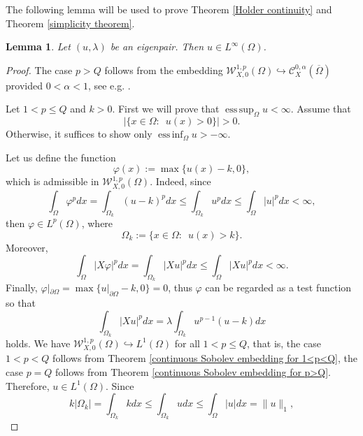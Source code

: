 \documentclass[a4paper,12pt,reqno]{amsart}
\numberwithin{equation}{section}
\theoremstyle{plain}
\newtheorem{lemma}[theorem]{Lemma}
\theoremstyle{definition}
\DeclareMathOperator*{\esssup}{ess\,sup}
\DeclareMathOperator*{\essinf}{ess\,inf}
\begin{document}
The following lemma will be used to prove Theorem \ref{Holder continuity} and Theorem \ref{simplicity theorem}.
\begin{lemma}\label{L infty boundedness}
Let $(u,\lambda)$ be an eigenpair. Then $u\in L^{\infty}(\Omega)$.
\end{lemma}
\begin{proof}
The case $p>Q$ follows from the  embedding $\mathcal{W}_{X,0}^{1, p}(\Omega)\hookrightarrow \mathcal{C}^{0, \alpha}_{X}(\overline{\Omega})$ provided $0<\alpha<1$, see e.g. \cite[Remark 1.1]{chen2024sharp}.

Let $1<p\leq Q$ and $k>0$. First we will prove that $\esssup_{\Omega}u<\infty$. Assume that 
$$\left|\{x\in\Omega:\enspace u(x)>0\}\right|>0.$$
Otherwise, it suffices to show only $\essinf_{\Omega}u>-\infty$.

Let us define the function
\begin{equation*}
\varphi(x):=\max \{u(x)-k, 0\},
\end{equation*}
which is admissible in $\mathcal{W}_{X,0}^{1, p}(\Omega)$. Indeed, since
\begin{equation*}
    \int_{\Omega}\varphi^{p}dx=\int_{\Omega_{k}}(u-k)^{p}dx\leq \int_{\Omega_{k}}u^{p}dx\leq \int_{\Omega}|u|^{p}dx<\infty,
\end{equation*} 
then $\varphi\in L^{p}(\Omega)$, where
\begin{equation*}
\Omega_{k}:=\{x \in \Omega : \enspace u(x)>k\} .
\end{equation*}
Moreover, 
\begin{equation*}
\int_{\Omega}|X\varphi|^{p}dx=\int_{\Omega_{k}}|Xu|^{p}dx\leq \int_{\Omega}|Xu|^{p}dx<\infty.
\end{equation*}
Finally, $\varphi|_{\partial\Omega}=\max\{u|_{\partial\Omega}-k,0\}=0$, thus $\varphi$ can be regarded as a test function  so that
\begin{equation*}
\int_{\Omega_{k}}|X u|^{p} d x=\lambda \int_{\Omega_{k}}u^{p-1}(u-k) d x    
\end{equation*}
holds. We have $\mathcal{W}_{X,0}^{1, p}(\Omega)\hookrightarrow L^{1}(\Omega)$ for all $1<p\leq Q$, that is, the case $1<p<Q$ follows from Theorem \ref{continuous Sobolev embedding for 1<p<Q}, the case $p=Q$ follows from Theorem \ref{continuous Sobolev embedding for p>Q}. Therefore, $u\in L^{1}(\Omega)$. Since
\begin{equation}\label{upper bound: some properties 0}
 k\left|\Omega_{k}\right|=   \int_{\Omega_{k}}kdx\leq \int_{\Omega_{k}} u dx\leq \int_{\Omega} |u| dx=\|u\|_{1},

\end{equation}
\end{proof}
\end{document}

